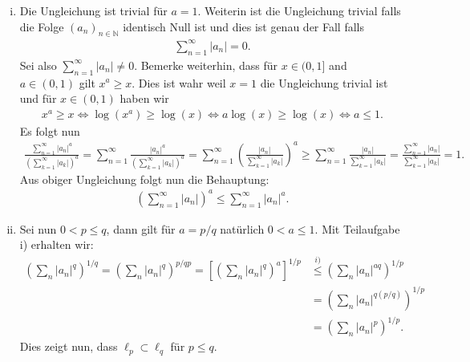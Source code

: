 \documentclass[a4paper, 20]{exam}
\begin{document}
\begin{solution}
\begin{enumerate}[i)]
\item Die Ungleichung ist trivial für $a=1$. Weiterin ist die Ungleichung trivial falls die Folge $(a_n)_{n \in \mathbb{N}}$ identisch Null ist und dies ist genau der Fall falls 
\begin{align*}
\sum_{n=1}^\infty |a_n|=0.
\end{align*}
Sei also $\sum_{n=1}^\infty |a_n| \neq 0$. Bemerke weiterhin, dass für $x \in (0,1]$ and $a \in (0,1)$ gilt $x^a \geq x$. Dies ist wahr weil $x =1$ die Ungleichung trivial ist und für $x \in (0,1)$ haben wir
\begin{align*}
x^a \geq x \iff  \log (x^a) \geq \log (x) \iff a \log(x) \geq \log (x) \iff a \leq 1.
\end{align*}
Es folgt nun
\begin{align*}
\frac{\sum_{n=1}^\infty |a_n|^a}{\left( \sum_{k=1}^\infty |a_k|\right)^a} = \sum_{n=1}^\infty \frac{|a_n|^a}{\left( \sum_{k=1}^\infty |a_k|\right)^a} = \sum_{n=1}^\infty \left( \frac{|a_n|}{\sum_{k=1}^\infty |a_k|}\right)^a \geq \sum_{n=1}^\infty \frac{|a_n|}{\sum_{k=1}^\infty |a_k|} = \frac{\sum_{n=1}^\infty |a_n|}{\sum_{k=1}^\infty |a_k|}=1.
\end{align*}
Aus obiger Ungleichung folgt nun die Behauptung:
\begin{align*}
\left( \sum_{n=1}^\infty |a_n| \right)^a \leq \sum_{n=1}^\infty |a_n|^a.
\end{align*}
\item Sei nun $0 < p \leq q$, dann gilt für $a = p/q$ natürlich $0<a \leq 1$. Mit Teilaufgabe i) erhalten wir:
\begin{align*}
\left( \sum_n |a_n|^q \right)^{1/q} = \left( \sum_n |a_n|^q \right)^{p/qp}  = \left[\left( \sum_{n} |a_n|^q \right)^a\right]^{1/p} &\overset{i)}\leq \left( \sum_n |a_n|^{aq} \right)^{1/p} \\
&= \left( \sum_{n} |a_n|^{q (p/q)} \right)^{1/p} \\
&= \left( \sum_n |a_n|^p \right)^{1/p}.
\end{align*}
Dies zeigt nun, dass $\ell_p \subset \ell_q$ für $p \leq q$. 
\end{enumerate}
\end{solution}
\end{document}
